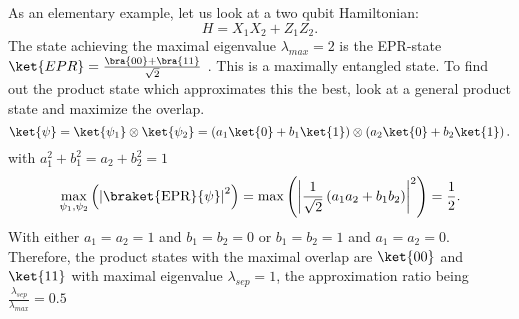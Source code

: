 As an elementary example, let us look at a two qubit Hamiltonian: \[
H=X_1X_2+Z_1Z_2
.\]
The state achieving the maximal eigenvalue $\lambda_{max}=2$ is the EPR-state $\ket{EPR}=\frac{\bra{00}+\bra{11}}{\sqrt{2}}$ .
This is a maximally entangled state.
To find out the product state which approximates this the best, look at a general product state and maximize the overlap.
\[
	\ket{\psi}=\ket{\psi_1}\otimes\ket{\psi_2}=\left(a_1\ket{0}+b_1\ket{1}\right)\otimes\left(a_2\ket{0}+b_2\ket{1}\right)
.\] with $a_1^2+b_1^2=a_2+b_2^2=1$
\[
\max_{\psi_1,\psi_2}\left(\left|\braket{\text{EPR}}{\psi}\right|^2\right)=\max\left(\left|\frac{1}{\sqrt{2}}\left(a_1a_2+b_1b_2\right)\right|^2\right)=\frac{1}{2}
.\]
With either $a_1=a_2=1$ and $b_1=b_2=0$ or $b_1=b_2=1$ and $a_1=a_2=0$.
Therefore, the product states with the maximal overlap are $\ket{00}$ and $\ket{11}$ with maximal eigenvalue $\lambda_{sep}=1$, the approximation ratio being  $\frac{\lambda_{sep}}{\lambda_{max}} = 0.5 $\\
